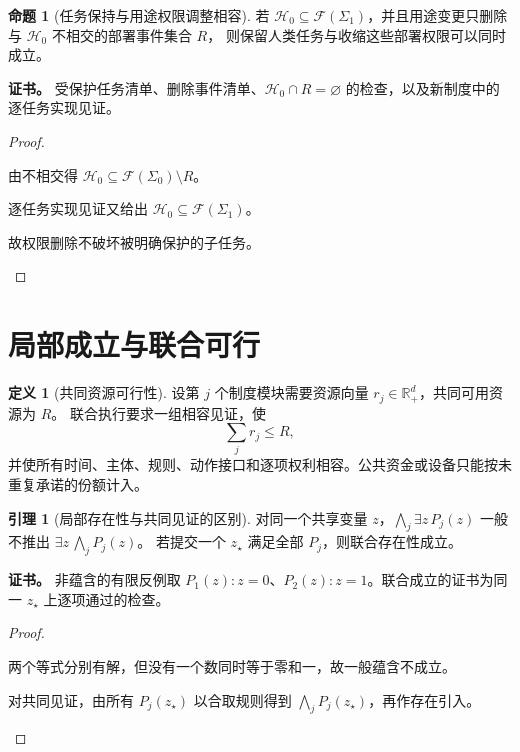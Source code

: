 \documentclass[UTF8,12pt,a4paper,openany,fontset=none,zihao=false]{ctexrep}
\theoremstyle{definition}
\newtheorem{definition}{定义}[chapter]
\newtheorem{lemma}{引理}[chapter]
\newtheorem{proposition}{命题}[chapter]
\newenvironment{certificate}{\par\noindent\textbf{证书。}\ignorespaces}{\par}
\newcommand{\RR}{\mathbb R}
\newcommand{\1}{\mathbf 1}
\begin{document}
\begin{proposition}[任务保持与用途权限调整相容]
若 \(\mathcal H_0\subseteq\mathcal F(\Sigma_1)\)，并且用途变更只删除与 \(\mathcal H_0\) 不相交的部署事件集合 \(R\)，
则保留人类任务与收缩这些部署权限可以同时成立。
\end{proposition}
\begin{certificate}
受保护任务清单、删除事件清单、\(\mathcal H_0\cap R=\varnothing\) 的检查，以及新制度中的逐任务实现见证。
\end{certificate}
\begin{proof}
\begin{semanticsteps}
\item 由不相交得 \(\mathcal H_0\subseteq\mathcal F(\Sigma_0)\setminus R\)。
\item 逐任务实现见证又给出 \(\mathcal H_0\subseteq\mathcal F(\Sigma_1)\)。
\item 故权限删除不破坏被明确保护的子任务。
\end{semanticsteps}
\end{proof}

\section{局部成立与联合可行}

\begin{definition}[共同资源可行性]
设第 \(j\) 个制度模块需要资源向量 \(r_j\in\RR_+^d\)，共同可用资源为 \(R\)。
联合执行要求一组相容见证，使
\[
\sum_jr_j\le R,
\]
并使所有时间、主体、规则、动作接口和逐项权利相容。公共资金或设备只能按未重复承诺的份额计入。
\end{definition}

\begin{lemma}[局部存在性与共同见证的区别]
\label{base:joint}
对同一个共享变量 \(z\)，\(\bigwedge_j\exists z\,P_j(z)\) 一般不推出 \(\exists z\,\bigwedge_jP_j(z)\)。
若提交一个 \(z_\star\) 满足全部 \(P_j\)，则联合存在性成立。
\end{lemma}
\begin{certificate}
非蕴含的有限反例取 \(P_1(z):z=0\)、\(P_2(z):z=1\)。联合成立的证书为同一 \(z_\star\) 上逐项通过的检查。
\end{certificate}
\begin{proof}
\begin{semanticsteps}
\item 两个等式分别有解，但没有一个数同时等于零和一，故一般蕴含不成立。
\item 对共同见证，由所有 \(P_j(z_\star)\) 以合取规则得到 \(\bigwedge_jP_j(z_\star)\)，再作存在引入。
\end{semanticsteps}
\end{proof}
\end{document}
